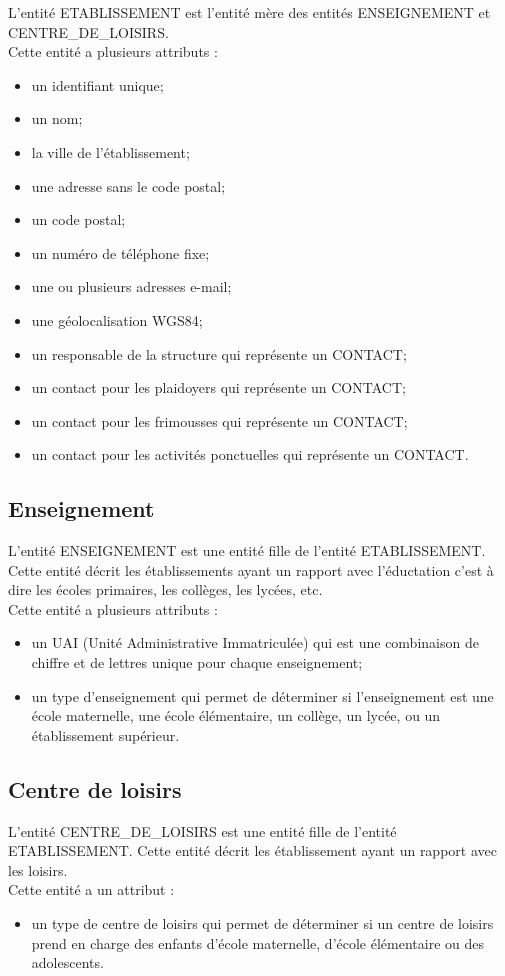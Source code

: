 \documentclass[asi, sansVersion]{picINSA}
\begin{document}
L'entité ETABLISSEMENT est l'entité mère des entités ENSEIGNEMENT et CENTRE\_DE\_LOISIRS. \\
Cette entité a plusieurs attributs : 
\begin{itemize}
\item un identifiant unique;
\item un nom;
\item la ville de l'établissement;
\item une adresse sans le code postal;
\item un code postal;
\item un numéro de téléphone fixe;
\item une ou plusieurs adresses e-mail; %
\item une géolocalisation WGS84; %
\item un responsable de la structure qui représente un CONTACT; %
\item un contact pour les plaidoyers qui représente un CONTACT; %
\item un contact pour les frimousses qui représente un CONTACT; %
\item un contact pour les activités ponctuelles qui représente un CONTACT. %
\end{itemize}

\subsection*{Enseignement}
L'entité ENSEIGNEMENT est une entité fille de l'entité ETABLISSEMENT. Cette entité décrit les établissements ayant un rapport avec l'éductation c'est à dire les écoles primaires, les collèges, les lycées, etc. \\
Cette entité a plusieurs attributs : 
\begin{itemize}
\item un UAI (Unité Administrative Immatriculée) qui est une combinaison de chiffre et de lettres unique pour chaque enseignement;
\item un type d'enseignement qui permet de déterminer si l'enseignement est une école maternelle, une école élémentaire, un collège, un lycée, ou un établissement supérieur. 
\end{itemize} 


\subsection*{Centre de loisirs}
L'entité CENTRE\_DE\_LOISIRS est une entité fille de l'entité ETABLISSEMENT. Cette entité décrit les établissement ayant un rapport avec les loisirs. \\
Cette entité a un attribut : 
\begin{itemize}
\item un type de centre de loisirs qui permet de déterminer si un centre de loisirs prend en charge des enfants d'école maternelle, d'école élémentaire ou des adolescents.
\end{itemize}  
\end{document}
